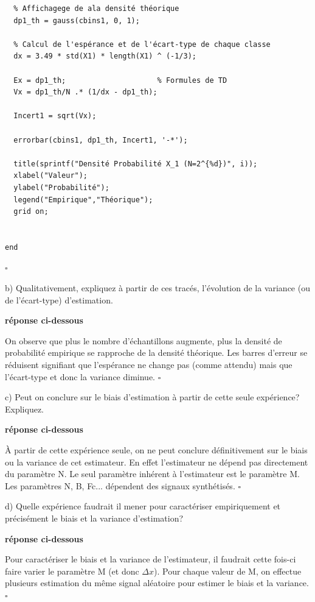 \documentclass{article}
\newcommand{\debutrep}[1]{\color{blue}\begin{center} \hrulefill \textbf{ #1 } \hrulefill \end{center} }
\newcommand{\finrep}{\vspace*{5mm}\hfill $\square$\color{black}\vspace*{5mm}}
\begin{document}
\begin{list}{}{\setlength{\leftmargin}{6mm} \setlength{\labelwidth}{20mm} \setlength{\labelsep}{2mm} \setlength{\itemsep}{1mm} }
\begin{verbatim}
  % Affichagege de ala densité théorique
  dp1_th = gauss(cbins1, 0, 1);
  
  % Calcul de l'espérance et de l'écart-type de chaque classe
  dx = 3.49 * std(X1) * length(X1) ^ (-1/3);
  
  Ex = dp1_th;                     % Formules de TD
  Vx = dp1_th/N .* (1/dx - dp1_th);
  
  Incert1 = sqrt(Vx);
  
  errorbar(cbins1, dp1_th, Incert1, '-*');
  
  title(sprintf("Densité Probabilité X_1 (N=2^{%d})", i));
  xlabel("Valeur");
  ylabel("Probabilité");
  legend("Empirique","Théorique");
  grid on;
  

end
\end{verbatim}
\finrep

\item[b)] Qualitativement, expliquez à partir de ces tracés, l'évolution de la variance (ou de l'écart-type) d'estimation.

\debutrep{réponse ci-dessous}
On observe que plus le nombre d'échantillons augmente, plus la densité de probabilité empirique se rapproche de la densité théorique. Les barres d'erreur se réduisent signifiant que l'espérance ne change pas (comme attendu) mais que l'écart-type et donc la variance diminue.
\finrep

\item [c)] Peut on conclure sur le biais d'estimation à partir de cette seule expérience? Expliquez.

\debutrep{réponse ci-dessous}
À partir de cette expérience seule, on ne peut conclure définitivement sur le biais ou la variance de cet estimateur. En effet l'estimateur ne dépend pas directement du paramètre N. Le seul paramètre inhérent à l'estimateur est le paramètre M. Les paramètres N, B, Fc... dépendent des signaux synthétisés.
\finrep

\item[d)] Quelle expérience faudrait il mener pour caractériser empiriquement et précisément le biais et la variance d'estimation?

\debutrep{réponse ci-dessous}
Pour caractériser le biais et la variance de l'estimateur, il faudrait cette fois-ci faire varier le paramètre M (et donc $\Delta x$). Pour chaque valeur de M, on effectue plusieurs estimation du même signal aléatoire pour estimer le biais et la variance.
\finrep


\end{list}
\end{document}
